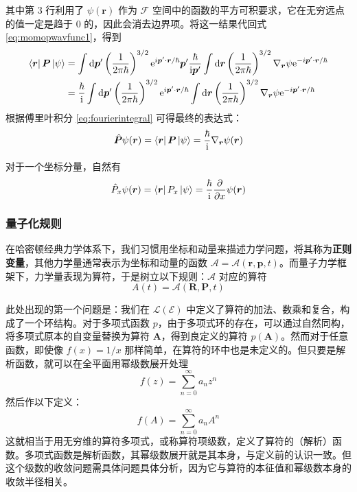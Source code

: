 \documentclass[cn,10pt,math=newtx,citestyle=gb7714-2015,bibstyle=gb7714-2015]{elegantbook}
\def\bm{\boldsymbol}
\def\ms{\mathscr}
\def\mc{\mathcal}
\def\d{\mathrm d}
\def\e{\mathrm e}
\def\i{\mathrm i}
\def\p{\partial}
\begin{document}
其中第 3 行利用了 $\psi(\bm r)$ 作为 $\mc F$ 空间中的函数的平方可积要求，它在无穷远点的值一定是趋于 0 的，因此会消去边界项。将这一结果代回式 \ref{eq:momopwavfunc1}，得到
\begin{align*}
   \bra{\bm r}\bm P\ket{\psi}&=\int\d\bm p'\left(\frac{1}{2\pi\hbar}\right)^{3/2}\e^{i\bm p'\cdot\bm r/\hbar}\bm p'\frac{\hbar}{\i\bm p'}\int\d\bm r\left(\frac{1}{2\pi\hbar}\right)^{3/2}\nabla_{\bm r}\psi\e^{-i\bm p'\cdot\bm r/\hbar}\\
   &=\frac{\hbar}{\i}\int\d\bm p'\left(\frac{1}{2\pi\hbar}\right)^{3/2}\e^{i\bm p'\cdot\bm r/\hbar}\int\d\bm r\left(\frac{1}{2\pi\hbar}\right)^{3/2}\nabla_{\bm r}\psi\e^{-i\bm p'\cdot\bm r/\hbar}
\end{align*}
根据傅里叶积分 \ref{eq:fourierintegral} 可得最终的表达式：
\begin{equation}
    \hat{\bm P}\psi(\bm r) = \bra{\bm r}\bm P\ket{\psi}=\frac{\hbar}{\i}\nabla_{\bm r}\psi(\bm r)
\end{equation}

对于一个坐标分量，自然有
\begin{equation}
   \hat{P}_x\psi(\bm r) = \bra{\bm r}P_x\ket{\psi}=\frac{\hbar}{\i}\frac{\p }{\p x}\psi(\bm r)
\end{equation}

\subsubsection{量子化规则}

在哈密顿经典力学体系下，我们习惯用坐标和动量来描述力学问题，将其称为\textbf{正则变量}，其他力学量通常表示为坐标和动量的函数 $\bm{\mc A}=\bm{\mc A}(\bm r,\bm p, t)$。而量子力学框架下，力学量表现为算符，于是树立以下规则：$\bm{\mc A}$ 对应的算符
\begin{equation}
    \label{eq:quantization}
   A(t)=\bm{\mc A}(\bm R, \bm P, t)
\end{equation}

此处出现的第一个问题是：我们在 $\mc L(\ms E)$ 中定义了算符的加法、数乘和复合，构成了一个环结构。对于多项式函数 $p$，由于多项式环的存在，可以通过自然同构，将多项式原本的自变量替换为算符 $\bm A$，得到良定义的算符 $p(\bm A)$。然而对于任意函数，即使像 $f(x)=1/x$ 那样简单，在算符的环中也是未定义的。但只要是解析函数，就可以在全平面用幂级数展开处理
\begin{equation}
    f(z)=\sum_{n=0}^\infty a_nz^n
\end{equation}
然后作以下定义：
\begin{equation}
    f(A)=\sum_{n=0}^\infty a_nA^n
\end{equation}
这就相当于用无穷维的算符多项式，或称算符项级数，定义了算符的（解析）函数。多项式函数是解析函数，其幂级数展开就是其本身，与定义前的认识一致。但这个级数的收敛问题需具体问题具体分析，因为它与算符的本征值和幂级数本身的收敛半径相关。
\end{document}
